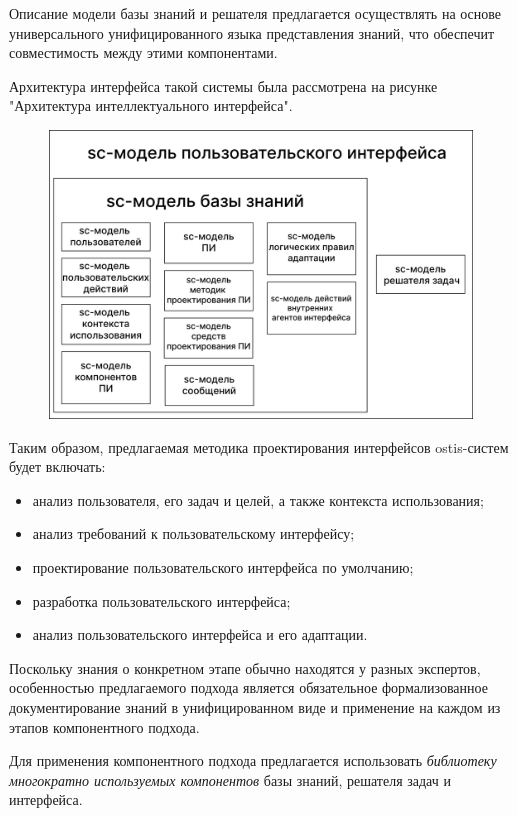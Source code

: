 Описание модели базы знаний и решателя предлагается осуществлять на основе универсального унифицированного языка представления знаний, что обеспечит совместимость между этими компонентами.

Архитектура интерфейса такой системы была рассмотрена на рисунке "Архитектура интеллектуального интерфейса"{}.

\begin{figure}[h]
	\centering
	\includegraphics[scale=0.15]{images/part5/sc-model-ui.png}
\end{figure}

Таким образом, предлагаемая методика проектирования интерфейсов ostis-систем будет включать:
\begin{itemize}
\item анализ пользователя, его задач и целей, а также контекста использования;
\item анализ требований к пользовательскому интерфейсу;
\item проектирование пользовательского интерфейса по умолчанию;
\item разработка пользовательского интерфейса;
\item анализ пользовательского интерфейса и его адаптации.
\end{itemize}

Поскольку знания о конкретном этапе обычно находятся у разных экспертов, особенностью предлагаемого подхода является обязательное формализованное документирование знаний в унифицированном виде и применение на каждом из этапов компонентного подхода.

Для применения компонентного подхода предлагается использовать \textit{библиотеку многократно используемых компонентов} базы знаний, решателя задач и интерфейса.

